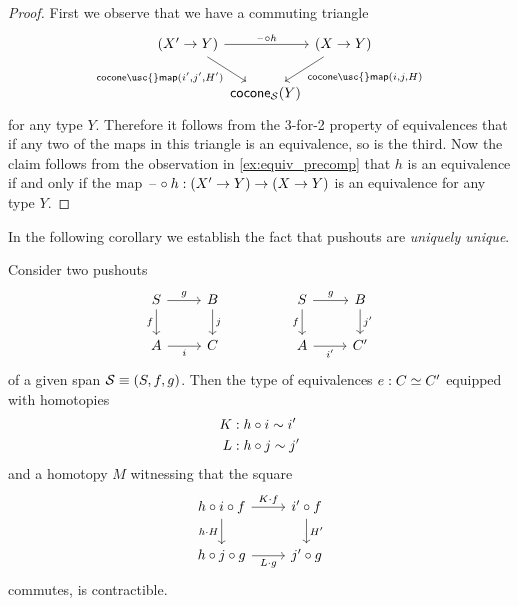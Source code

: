 \begin{proof}
  First we observe that we have a commuting triangle
  \begin{equation*}
    \begin{tikzcd}[column sep=0]
      (X'\to Y) \arrow[rr,"\blank\circ h"]
      \arrow[dr,swap,"{\mathsf{cocone\usc{}map}(i',j',H')}"]
      & & (X\to Y) \arrow[dl,"{\mathsf{cocone\usc{}map}(i,j,H)}"] \\
      & \mathsf{cocone}_{\mathcal{S}}(Y) & \phantom{(X'\to Y)}
    \end{tikzcd}
  \end{equation*}
  for any type $Y$. Therefore it follows from the 3-for-2 property of equivalences that if any two of the maps in this triangle is an equivalence, so is the third. Now the claim follows from the observation in \cref{ex:equiv_precomp} that $h$ is an equivalence if and only if the map $\mathord{\hspace{1pt}\text{--}\hspace{1pt}}\circ h:(X'\to Y)\to (X\to Y)$ is an equivalence for any type $Y$.
\end{proof}

In the following corollary we establish the fact that pushouts are \emph{uniquely unique}.

\begin{cor}
  Consider two pushouts
  \begin{equation*}
    \begin{tikzcd}
      S \arrow[r,"g"] \arrow[d,swap,"f"] & B \arrow[d,"j"]
      & & S \arrow[r,"g"] \arrow[d,swap,"f"] & B \arrow[d,"{j'}"] \\
      A \arrow[r,swap,"i"] & C
      & & A \arrow[r,swap,"{i'}"] & C'
    \end{tikzcd}
  \end{equation*}
  of a given span $\mathcal{S}\equiv (S,f,g)$. Then the type of equivalences $e:\eqv{C}{C'}$ equipped with homotopies
  \begin{align*}
    K & : h\circ i \sim i' \\
    L & : h\circ j \sim j'
  \end{align*}
  and a homotopy $M$ witnessing that the square
  \begin{equation*}
    \begin{tikzcd}
      h\circ i\circ f \arrow[r,"K\cdot f"] \arrow[d,swap,"h\cdot H"] & i' \circ f \arrow[d,"{H'}"] \\
      h\circ j\circ g \arrow[r,swap,"L\cdot g"] & j'\circ g
    \end{tikzcd}
  \end{equation*}
  commutes, is contractible.
\end{cor}

